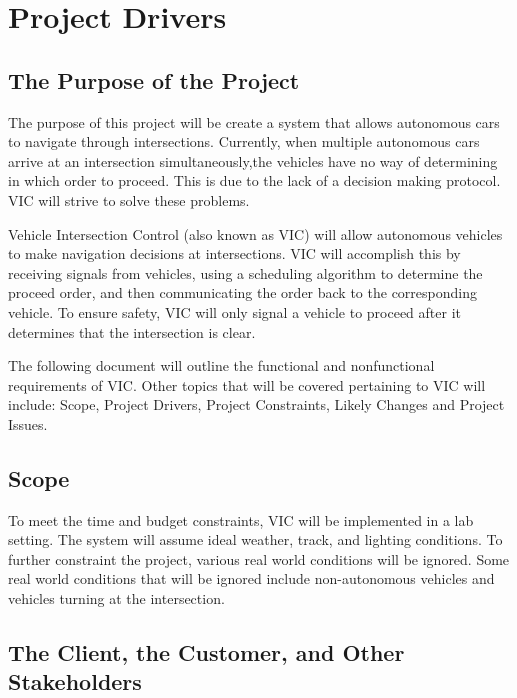 \documentclass [11pt]{article}
\begin{document}


\section {\textbf{Project Drivers}}


\subsection{The Purpose of the Project} 

The purpose of this project will be create a system that allows autonomous cars to navigate through  intersections. Currently, when multiple autonomous cars arrive at an intersection simultaneously,the vehicles have no way of determining in which order to proceed. This is due to the lack of a decision making protocol. VIC will strive to solve these problems.  \newline


Vehicle Intersection Control (also known as VIC) will allow autonomous vehicles to make navigation decisions at intersections. VIC will accomplish this by receiving signals from vehicles, using a scheduling algorithm to determine the proceed order, and then communicating the order back to the corresponding vehicle. To ensure safety, VIC will only signal a vehicle to proceed after it determines that the intersection is clear. \newline

The following document will outline the functional and nonfunctional requirements of VIC.  Other topics that will be covered pertaining to VIC will include: Scope, Project Drivers, Project Constraints, Likely Changes and Project Issues.

\subsection{Scope}
To meet the time and budget constraints, VIC will be implemented in a lab setting. The system will assume ideal weather, track, and lighting conditions. To further constraint the project, various real world conditions will be ignored. Some real world conditions that will be ignored include non-autonomous vehicles and vehicles turning at the intersection. 

\subsection{The Client, the Customer, and Other Stakeholders}
\end{document}
